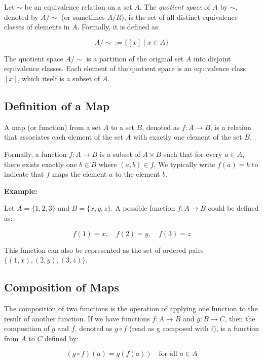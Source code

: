 Let \(\sim\) be an equivalence relation on a set \(A\). The \emph{quotient space} of \(A\) by 
\(\sim\), denoted by \(A/\sim\) (or sometimes \(A/R\)), is the set of all distinct equivalence classes of 
elements in \(A\). Formally, it is defined as:

\[
	A/\sim := \{[x] \mid x \in A\}
\]

The quotient space \(A/\sim\) is a partition of the original set \(A\) into disjoint equivalence classes. 
Each element of the quotient space is an equivalence class \([x]\), which itself is a subset of \(A\).

\subsection{Definition of a Map}

A map (or function) from a set \(A\) to a set \(B\), denoted as \(f: A \to B\), is a relation that 
associates each element of the set \(A\) with exactly one element of the set \(B\).

Formally, a function \(f: A \to B\) is a subset of \(A \times B\) such that for every \(a \in A\), there 
exists exactly one \(b \in B\) where \((a,b) \in f\). We typically write \(f(a) = b\) to indicate that 
\(f\) maps the element \(a\) to the element \(b\).
\vspace{\baselineskip}

\textbf{Example:}
\vspace{\baselineskip}

Let \(A = \{1, 2, 3\}\) and \(B = \{x, y, z\}\). A possible function \(f: A \to B\) could be defined as:

\[
	f(1) = x, \quad f(2) = y, \quad f(3) = z
\]

This function can also be represented as the set of ordered pairs \(\{(1,x), (2,y), (3,z)\}\).

\subsection{Composition of Maps}

The composition of two functions is the operation of applying one function to the result of another 
function. If we have functions \(f: A \to B\) and \(g: B \rightarrow C\), then the composition of \(g\) 
and \(f\), denoted as \(g \circ f\) (read as g composed with f), is a function from \(A\) to \(C\) defined 
by:

\[
	(g \circ f)(a) = g(f(a)) \quad \text{for all } a \in A
\]

